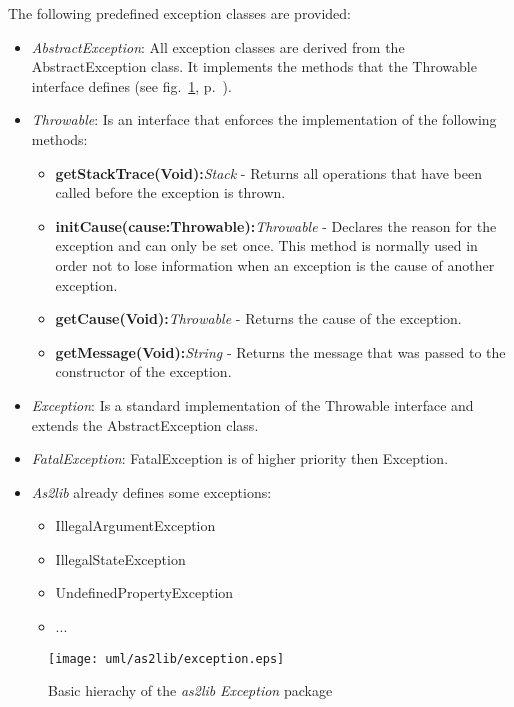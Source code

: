 The following predefined exception classes are provided:

\begin{itemize}
	\item \emph{AbstractException}: All exception classes are derived from the AbstractException class. It implements the methods that the Throwable interface defines (see fig.\ \ref{fig:exception}, p.\ \pageref{fig:exception}).
	\item \emph{Throwable}: Is an interface that enforces the implementation of the following methods:
		\begin{itemize}
			\item \textbf{getStackTrace(Void):}\textit{Stack} - Returns all operations that have been called before the exception is thrown.
			\item \textbf{initCause(cause:Throwable):}\textit{Throwable} - Declares the reason for the exception and can only be set once. This method is normally used in order not to lose information when an exception is the cause of another exception.
			\item \textbf{getCause(Void):}\textit{Throwable} - Returns the cause of the exception.
			\item \textbf{getMessage(Void):}\textit{String} - Returns the message that was passed to the constructor of the exception.
		\end{itemize}
	\item \emph{Exception}: Is a standard implementation of the Throwable interface and extends the AbstractException class.
	\item \emph{FatalException}: FatalException is of higher priority then Exception.
	\item {\sl As2lib} already defines some exceptions:
	\begin{itemize}
		\item IllegalArgumentException
		\item IllegalStateException
		\item UndefinedPropertyException
		\item ...
	\end{itemize}
\end{itemize}

\begin{figure}[!ht]
\begin{center}
\texttt{[image: uml/as2lib/exception.eps]}
\caption{Basic hierachy of the {\sl as2lib} \emph{Exception} package}
\label{fig:exception}
\end{center}
\end{figure}

